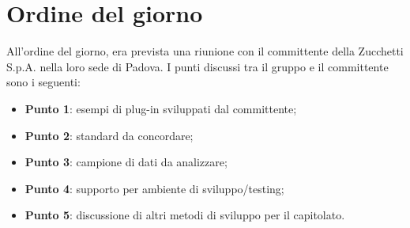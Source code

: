 \section{Ordine del giorno}
All'ordine del giorno, era prevista una riunione  con il committente della Zucchetti S.p.A. nella loro sede di Padova. 
I punti discussi tra il gruppo e il committente sono i seguenti: 
\begin{itemize}
	\item \textbf{Punto 1}: esempi di plug-in sviluppati dal committente; 
	\item \textbf{Punto 2}: standard da concordare; 
	\item \textbf{Punto 3}: campione di dati da analizzare; 
	\item \textbf{Punto 4}: supporto per ambiente di sviluppo/testing;
	\item \textbf{Punto 5}: discussione di altri metodi di sviluppo per il capitolato.
\end{itemize}
